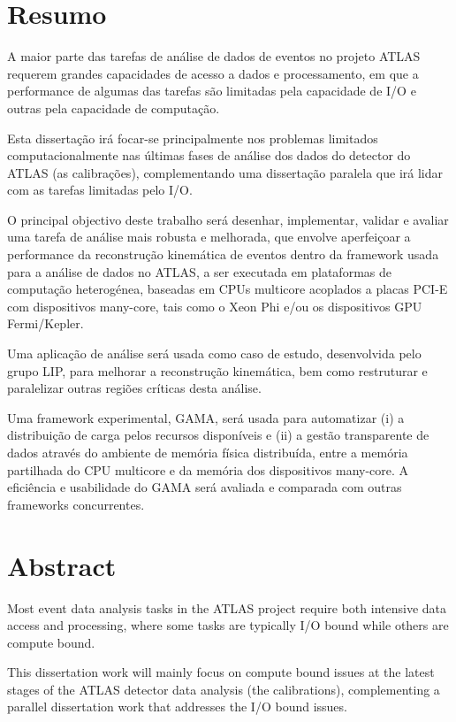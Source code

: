 
\chapter*{Resumo}

A maior parte das tarefas de análise de dados de eventos no projeto ATLAS requerem grandes capacidades de acesso a dados e processamento, em que a performance de algumas das tarefas são limitadas pela capacidade de I/O e outras pela capacidade de computação.

Esta dissertação irá focar-se principalmente nos problemas limitados computacionalmente nas últimas fases de análise dos dados do detector do ATLAS (as calibrações), complementando uma dissertação paralela que irá lidar com as tarefas limitadas pelo I/O.

O principal objectivo deste trabalho será desenhar, implementar, validar e avaliar uma tarefa de análise mais robusta e melhorada, que envolve aperfeiçoar a performance da reconstrução kinemática de eventos dentro da framework usada para a análise de dados no ATLAS, a ser executada em plataformas de computação heterogénea, baseadas em CPUs multicore acoplados a placas PCI-E com dispositivos many-core, tais como o \intel Xeon Phi e/ou os dispositivos GPU \nvidia Fermi/Kepler.

Uma aplicação de análise será usada como caso de estudo, desenvolvida pelo grupo LIP, para melhorar a reconstrução kinemática, bem como restruturar e paralelizar outras regiões críticas desta análise.

Uma framework experimental, GAMA, será usada para automatizar (i) a distribuição de carga pelos recursos disponíveis e (ii) a gestão transparente de dados através do ambiente de memória física distribuída, entre a memória partilhada do CPU multicore e da memória dos dispositivos many-core. A eficiência e usabilidade do GAMA será avaliada e comparada com outras frameworks concurrentes.

\newpage {}
\chapter*{Abstract}

Most event data analysis tasks in the ATLAS project require both intensive data access and processing, where some tasks are typically I/O bound while others are compute bound.

This dissertation work will mainly focus on compute bound issues at the latest stages of the ATLAS detector data analysis (the calibrations), complementing a parallel dissertation work that addresses the I/O bound issues.

